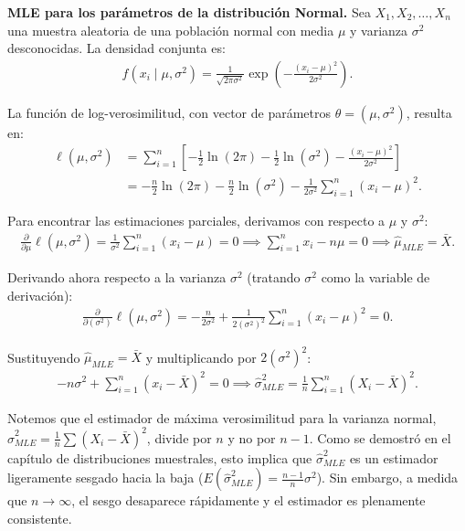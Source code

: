 \begin{ejemplo}
	\textbf{MLE para los parámetros de la distribución Normal.}
	Sea $X_1, X_2, \ldots, X_n$ una muestra aleatoria de una población normal con media $\mu$ y varianza $\sigma^2$ desconocidas. La densidad conjunta es:
	\begin{align}
		f(x_i \mid \mu, \sigma^2) = \frac{1}{\sqrt{2\pi\sigma^2}} \exp\left( -\frac{(x_i - \mu)^2}{2\sigma^2} \right).
	\end{align}

	La función de log-verosimilitud, con vector de parámetros $\theta = (\mu, \sigma^2)$, resulta en:
	\begin{align}
		\ell(\mu, \sigma^2) &= \sum_{i=1}^n \left[ -\frac{1}{2}\ln(2\pi) - \frac{1}{2}\ln(\sigma^2) - \frac{(x_i - \mu)^2}{2\sigma^2} \right] \\
		&= -\frac{n}{2}\ln(2\pi) - \frac{n}{2}\ln(\sigma^2) - \frac{1}{2\sigma^2}\sum_{i=1}^n (x_i - \mu)^2.
	\end{align}

	Para encontrar las estimaciones parciales, derivamos con respecto a $\mu$ y $\sigma^2$:
	\begin{align}
		\frac{\partial}{\partial \mu} \ell(\mu, \sigma^2) = \frac{1}{\sigma^2}\sum_{i=1}^n (x_i - \mu) = 0 \implies \sum_{i=1}^n x_i - n\mu = 0 \implies \hat{\mu}_{MLE} = \bar{X}.
	\end{align}

	Derivando ahora respecto a la varianza $\sigma^2$ (tratando $\sigma^2$ como la variable de derivación):
	\begin{align}
		\frac{\partial}{\partial (\sigma^2)} \ell(\mu, \sigma^2) = -\frac{n}{2\sigma^2} + \frac{1}{2(\sigma^2)^2} \sum_{i=1}^n (x_i - \mu)^2 = 0.
	\end{align}

	Sustituyendo $\hat{\mu}_{MLE} = \bar{X}$ y multiplicando por $2(\sigma^2)^2$:
	\begin{align}
		-n\sigma^2 + \sum_{i=1}^n (x_i - \bar{X})^2 = 0 \implies \hat{\sigma}^2_{MLE} = \frac{1}{n}\sum_{i=1}^n (X_i - \bar{X})^2.
	\end{align}
\end{ejemplo}

\begin{observacion}
	Notemos que el estimador de máxima verosimilitud para la varianza normal, $\hat{\sigma}^2_{MLE} = \frac{1}{n}\sum (X_i - \bar{X})^2$, divide por $n$ y no por $n-1$. Como se demostró en el capítulo de distribuciones muestrales, esto implica que $\hat{\sigma}^2_{MLE}$ es un estimador ligeramente sesgado hacia la baja ($E(\hat{\sigma}^2_{MLE}) = \frac{n-1}{n}\sigma^2$). Sin embargo, a medida que $n \to \infty$, el sesgo desaparece rápidamente y el estimador es plenamente consistente.
\end{observacion}

